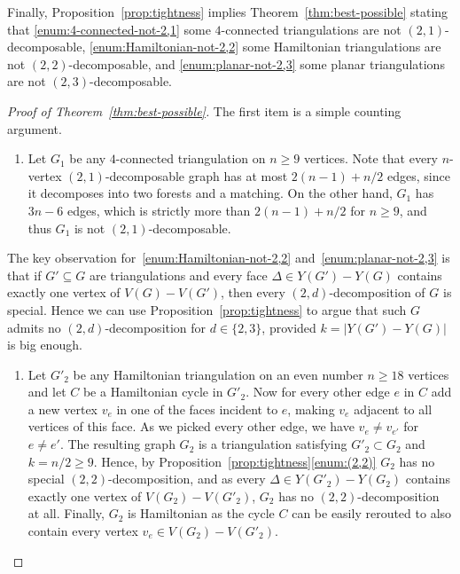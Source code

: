 \documentclass[a4paper,10pt]{article}
\theoremstyle{plain}
\begin{document}
Finally, Proposition~\ref{prop:tightness} implies Theorem~\ref{thm:best-possible} stating that \ref{enum:4-connected-not-2,1} some $4$-connected triangulations are not $(2,1)$-decomposable, \ref{enum:Hamiltonian-not-2,2} some Hamiltonian triangulations are not $(2,2)$-decomposable, and \ref{enum:planar-not-2,3} some planar triangulations are not $(2,3)$-decomposable.


\begin{proof}[Proof of Theorem~\ref{thm:best-possible}]
 The first item is a simple counting argument.
 
 \begin{enumerate}[label = (\roman*)]
  \item Let $G_1$ be any $4$-connected triangulation on $n \geq 9$ vertices.
   Note that every $n$-vertex $(2,1)$-decomposable graph has at most $2(n-1) + n/2$ edges, since it decomposes into two forests and a matching.
   On the other hand, $G_1$ has $3n-6$ edges, which is strictly more than $2(n-1)+n/2$ for $n \geq 9$, and thus $G_1$ is not $(2,1)$-decomposable.
 \end{enumerate}
 
 The key observation for~\ref{enum:Hamiltonian-not-2,2} and~\ref{enum:planar-not-2,3} is that if $G' \subseteq G$ are triangulations and every face $\Delta \in Y(G') - Y(G)$ contains exactly one vertex of $V(G) - V(G')$, then every $(2,d)$-decomposition of $G$ is special.
 Hence we can use Proposition~\ref{prop:tightness} to argue that such $G$ admits no $(2,d)$-decomposition for $d \in \{2,3\}$, provided $k = |Y(G')-Y(G)|$ is big enough.
 
 \begin{enumerate}[label = (\roman*), start = 2]
  \item Let $G'_2$ be any Hamiltonian triangulation on an even number $n \geq 18$ vertices and let $C$ be a Hamiltonian cycle in $G'_2$.
   Now for every other edge $e$ in $C$ add a new vertex $v_e$ in one of the faces incident to $e$, making $v_e$ adjacent to all vertices of this face.
   As we picked every other edge, we have $v_e \neq v_{e'}$ for $e \neq e'$.
   The resulting graph $G_2$ is a triangulation satisfying $G'_2 \subset G_2$ and $k =  n/2  \geq 9$.
   Hence, by Proposition~\ref{prop:tightness}\ref{enum:(2,2)} $G_2$ has no special $(2,2)$-decomposition, and as every $\Delta \in Y(G'_2) - Y(G_2)$ contains exactly one vertex of $V(G_2) - V(G'_2)$, $G_2$ has no $(2,2)$-decomposition at all.
   Finally, $G_2$ is Hamiltonian as the cycle $C$ can be easily rerouted to also contain every vertex $v_e \in V(G_2) - V(G'_2)$. 
   

\end{enumerate}
\end{proof}
\end{document}
